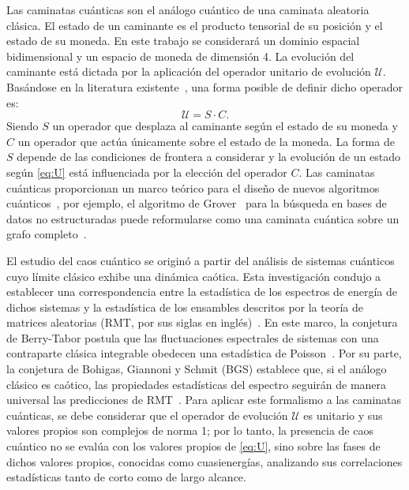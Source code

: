 \documentclass[11pt,a4paper]{article}  %
\begin{document}
Las caminatas cuánticas son el análogo cuántico de una caminata aleatoria clásica. El estado de un caminante es el producto tensorial de su posición y el estado de su moneda.
En este trabajo se considerará un dominio espacial bidimensional y un espacio de moneda de dimensión 4. 
La evolución del caminante está dictada por la aplicación del operador unitario de evolución $\mathcal{U}$. Basándose en la literatura existente~\cite{portugal2018quantum}, una forma posible de definir dicho operador es:
\begin{equation}
    \mathcal{U}=S\cdot C.
    \label{eq:U}
\end{equation}
Siendo $S$ un operador que desplaza al caminante según el estado de su moneda y $C$ un operador que actúa únicamente sobre el estado de la moneda.
La forma de $S$ depende de las condiciones de frontera a considerar y la evolución de un estado según \eqref{eq:U} está influenciada por la elección del operador $C$.
Las caminatas cuánticas proporcionan un marco teórico para el diseño de nuevos algoritmos cuánticos~\cite{shenvi2003quantum},
por ejemplo, el algoritmo de Grover~\cite{grover1996fastquantummechanicalalgorithm} para la búsqueda en bases de datos no estructuradas puede reformularse como una caminata cuántica sobre un grafo completo~\cite{portugal2018quantum}.

El estudio del caos cuántico se originó a partir del análisis de sistemas cuánticos cuyo límite clásico exhibe una dinámica caótica. Esta investigación condujo a establecer una correspondencia entre la estadística de los espectros de energía de dichos sistemas y la estadística de los ensambles descritos por la teoría de matrices aleatorias (RMT, por sus siglas en inglés)~\cite{bohigas1984characterization}.
En este marco, la conjetura de Berry-Tabor postula que las fluctuaciones espectrales de sistemas con una contraparte clásica integrable obedecen una estadística de Poisson~\cite{berry1977level}. Por su parte, la conjetura de Bohigas, Giannoni y Schmit (BGS) establece que, si el análogo clásico es caótico, las propiedades estadísticas del espectro seguirán de manera universal las predicciones de RMT~\cite{bohigas1984characterization}.
Para aplicar este formalismo a las caminatas cuánticas, se debe considerar que el operador de evolución $\mathcal{U}$ es unitario y sus valores propios son complejos de norma 1; por lo tanto, la presencia de caos cuántico no se evalúa con los valores propios de \eqref{eq:U}, sino sobre las fases de dichos valores propios, conocidas como cuasienergías, analizando sus correlaciones estadísticas tanto de corto como de largo alcance.
\end{document}
